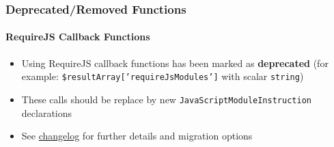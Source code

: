 %

\begin{frame}[fragile]
	\frametitle{Deprecated/Removed Functions}
	\framesubtitle{RequireJS Callback Functions}


	\begin{itemize}
		\item Using RequireJS callback functions has been marked as
			\textbf{deprecated}\newline
			\small(for example: \texttt{\$resultArray['requireJsModules']} with scalar \texttt{string})\normalsize
		\item These calls should be replace by new \texttt{JavaScriptModuleInstruction} declarations
		\item See \href{https://docs.typo3.org/c/typo3/cms-core/master/en-us/Changelog/11.5/Deprecation-95200-DeprecateRequireJSCallbacksAsInlineJavaScript.html}{changelog}
			for further details and migration options
	\end{itemize}

\end{frame}

